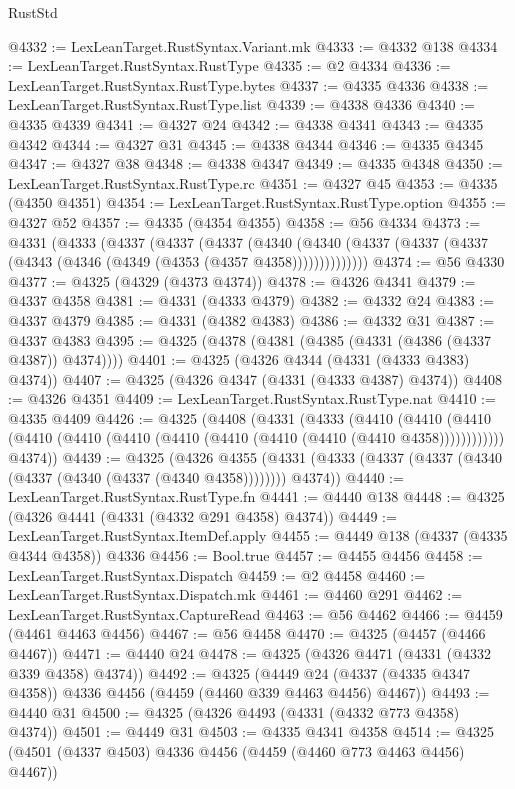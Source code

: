 \begin{lexlean}{RustStd}
\begin{coremodule}
@4332 := LexLeanTarget.RustSyntax.Variant.mk
@4333 := @4332 @138
@4334 := LexLeanTarget.RustSyntax.RustType
@4335 := @2 @4334
@4336 := LexLeanTarget.RustSyntax.RustType.bytes
@4337 := @4335 @4336
@4338 := LexLeanTarget.RustSyntax.RustType.list
@4339 := @4338 @4336
@4340 := @4335 @4339
@4341 := @4327 @24
@4342 := @4338 @4341
@4343 := @4335 @4342
@4344 := @4327 @31
@4345 := @4338 @4344
@4346 := @4335 @4345
@4347 := @4327 @38
@4348 := @4338 @4347
@4349 := @4335 @4348
@4350 := LexLeanTarget.RustSyntax.RustType.rc
@4351 := @4327 @45
@4353 := @4335 (@4350 @4351)
@4354 := LexLeanTarget.RustSyntax.RustType.option
@4355 := @4327 @52
@4357 := @4335 (@4354 @4355)
@4358 := @56 @4334
@4373 := @4331
    (@4333
      (@4337
        (@4337
          (@4337
            (@4340
              (@4340 (@4337 (@4337 (@4337 (@4343 (@4346 (@4349 (@4353 (@4357 @4358))))))))))))))
@4374 := @56 @4330
@4377 := @4325 (@4329 (@4373 @4374))
@4378 := @4326 @4341
@4379 := @4337 @4358
@4381 := @4331 (@4333 @4379)
@4382 := @4332 @24
@4383 := @4337 @4379
@4385 := @4331 (@4382 @4383)
@4386 := @4332 @31
@4387 := @4337 @4383
@4395 := @4325 (@4378 (@4381 (@4385 (@4331 (@4386 (@4337 @4387)) @4374))))
@4401 := @4325 (@4326 @4344 (@4331 (@4333 @4383) @4374))
@4407 := @4325 (@4326 @4347 (@4331 (@4333 @4387) @4374))
@4408 := @4326 @4351
@4409 := LexLeanTarget.RustSyntax.RustType.nat
@4410 := @4335 @4409
@4426 := @4325
    (@4408
      (@4331
        (@4333
          (@4410
            (@4410 (@4410 (@4410 (@4410 (@4410 (@4410 (@4410 (@4410 (@4410 (@4410 @4358))))))))))))
        @4374))
@4439 := @4325
    (@4326
      @4355
      (@4331 (@4333 (@4337 (@4337 (@4340 (@4337 (@4340 (@4337 (@4340 @4358)))))))) @4374))
@4440 := LexLeanTarget.RustSyntax.RustType.fn
@4441 := @4440 @138
@4448 := @4325 (@4326 @4441 (@4331 (@4332 @291 @4358) @4374))
@4449 := LexLeanTarget.RustSyntax.ItemDef.apply
@4455 := @4449 @138 (@4337 (@4335 @4344 @4358)) @4336
@4456 := Bool.true
@4457 := @4455 @4456
@4458 := LexLeanTarget.RustSyntax.Dispatch
@4459 := @2 @4458
@4460 := LexLeanTarget.RustSyntax.Dispatch.mk
@4461 := @4460 @291
@4462 := LexLeanTarget.RustSyntax.CaptureRead
@4463 := @56 @4462
@4466 := @4459 (@4461 @4463 @4456)
@4467 := @56 @4458
@4470 := @4325 (@4457 (@4466 @4467))
@4471 := @4440 @24
@4478 := @4325 (@4326 @4471 (@4331 (@4332 @339 @4358) @4374))
@4492 := @4325
    (@4449 @24 (@4337 (@4335 @4347 @4358)) @4336 @4456 (@4459 (@4460 @339 @4463 @4456) @4467))
@4493 := @4440 @31
@4500 := @4325 (@4326 @4493 (@4331 (@4332 @773 @4358) @4374))
@4501 := @4449 @31
@4503 := @4335 @4341 @4358
@4514 := @4325 (@4501 (@4337 @4503) @4336 @4456 (@4459 (@4460 @773 @4463 @4456) @4467))

\end{coremodule}
\end{lexlean}
